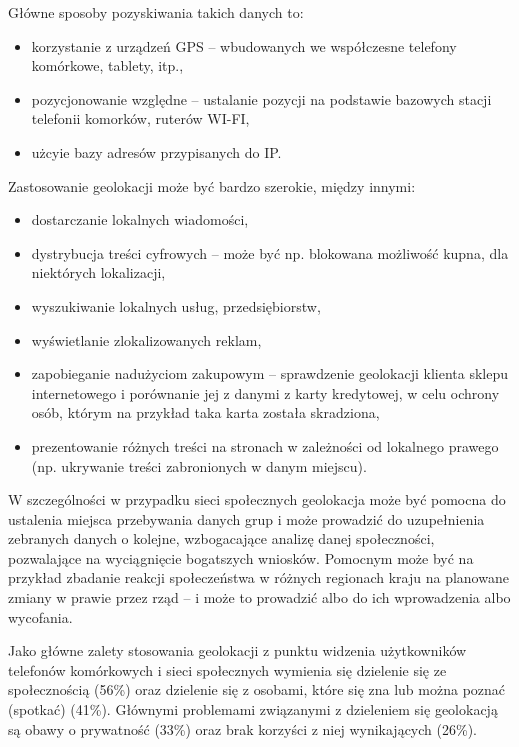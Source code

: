 Główne sposoby pozyskiwania takich danych to:
\begin{itemize}
  \item korzystanie z urządzeń GPS -- wbudowanych we współczesne telefony
komórkowe, tablety, itp.,
  \item pozycjonowanie względne -- ustalanie pozycji na podstawie bazowych stacji
telefonii komorków, ruterów WI-FI,
\item użcyie bazy adresów przypisanych do IP.
\end{itemize} 
Zastosowanie geolokacji może być bardzo szerokie, między innymi:
\begin{itemize}
  \item dostarczanie lokalnych wiadomości,
  
  \item dystrybucja treści cyfrowych -- może być np. blokowana możliwość kupna, 
  dla niektórych lokalizacji,
  
  \item wyszukiwanie lokalnych usług, przedsiębiorstw,
  
  \item wyświetlanie zlokalizowanych reklam,
  
  \item zapobieganie nadużyciom zakupowym -- sprawdzenie geolokacji
  klienta sklepu internetowego i porównanie jej z danymi z karty kredytowej,
  w celu ochrony osób, którym na przykład taka karta została skradziona,
  
  \item prezentowanie różnych treści na stronach w zależności od lokalnego
  prawego (np. ukrywanie treści zabronionych w danym miejscu).
\end{itemize}
W szczególności w przypadku sieci społecznych geolokacja może być pomocna do
ustalenia miejsca przebywania danych grup i może prowadzić
do uzupełnienia zebranych danych o kolejne, wzbogacające analizę danej społeczności,
pozwalające na wyciągnięcie bogatszych wniosków. Pomocnym może być na przykład
zbadanie reakcji społeczeństwa w różnych regionach kraju na planowane zmiany
w prawie przez rząd -- i może to prowadzić albo do ich wprowadzenia albo wycofania.

Jako główne zalety stosowania geolokacji \cite{lostInGeolocation} z punktu
widzenia użytkowników telefonów komórkowych i sieci społecznych wymienia się
dzielenie się ze społecznością (56\%) oraz dzielenie się z osobami, które się 
zna lub można poznać (spotkać) (41\%). Głównymi problemami związanymi z 
dzieleniem się geolokacją są obawy o prywatność (33\%) oraz brak korzyści z niej
wynikających (26\%).



